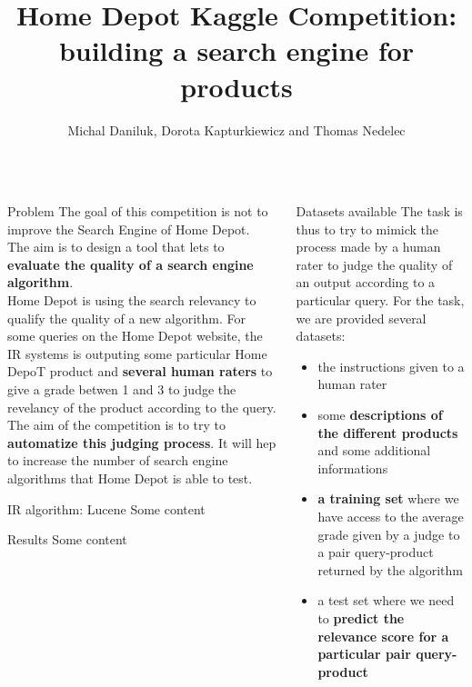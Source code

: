 \documentclass{beamer}
\title{Home Depot Kaggle Competition: building a search engine for products}
\author{Michal Daniluk, Dorota Kapturkiewicz and Thomas Nedelec}
\institute{%
  Department of Computing Science,
  University College London
}
\newlength\postercolumnwidth
\newlength\totalwidth
\begin{document}
\begin{frame}[t]{}
\centering
\begin{columns}[totalwidth=\totalwidth]
  \begin{column}[t]{\postercolumnwidth}
    \centering
    \begin{block}{Problem}
\small
 The goal of this competition is not to improve the Search Engine of Home Depot. 
\\ The aim is to design a tool that lets to \textbf{evaluate the quality of a search engine algorithm}. \\Home Depot is using the search relevancy to qualify the quality of a new algorithm. For some queries on the Home Depot website, the IR systems is outputing some particular Home DepoT product and \textbf{several human raters} to give a grade betwen 1 and 3 to judge the revelancy of the product according to the query. 
\\The aim of the competition is to try to \textbf{automatize this judging process}. It will hep to increase the number of search engine algorithms that Home Depot is able to test.
    \end{block}
    \begin{block}{IR algorithm: Lucene}
     Some content
    \end{block}
\begin{block}{Results}
      Some content
    \end{block}
\end{column} 
    
  \begin{column}[t]{\postercolumnwidth}
    \centering
\begin{block}{Datasets available}
\small
The task is thus to try to mimick the process made by a human rater to judge the quality of an output according to a particular query. For the task, we are provided several datasets: 
\begin{itemize}
\item the instructions given to a human rater 
\item some \textbf{descriptions of the different products} and some additional informations
\item\textbf{a training set} where we have access to the average grade given by a judge to a pair query-product returned by the algorithm
\item a test set where we need to \textbf{predict the relevance score for a particular pair query-product}
\end{itemize}     



\end{block}
\end{column}
\end{columns}
\end{frame}
\end{document}

